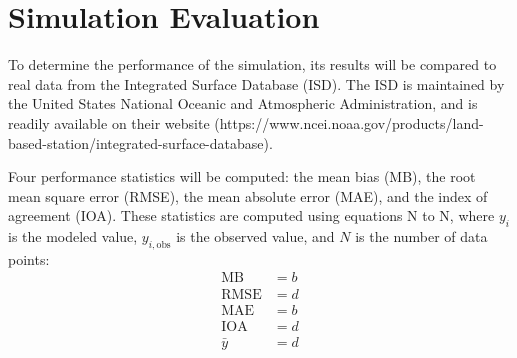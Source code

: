 \section{Simulation Evaluation}
	To determine the performance of the simulation, its results will be compared to real data from the Integrated Surface Database (ISD).
	The ISD is maintained by the United States National Oceanic and Atmospheric Administration, and is readily available on their website 
		(https://www.ncei.noaa.gov/products/land-based-station/integrated-surface-database).
	
	Four performance statistics will be computed: 
		the mean bias (MB),
		the root mean square error (RMSE),
		the mean absolute error (MAE), and
		the index of agreement (IOA).
	These statistics are computed using equations N to N,
		where $y_i$ is the modeled value, $y_{i,\text{obs}}$ is the observed value, and $N$ is the number of data points:
	\begin{align}
		\text{MB} &= b \\
		\text{RMSE} &= d \\
		\text{MAE} &= b \\
		\text{IOA} &= d \\
		\bar{y} &= d \\
	\end{align}
	